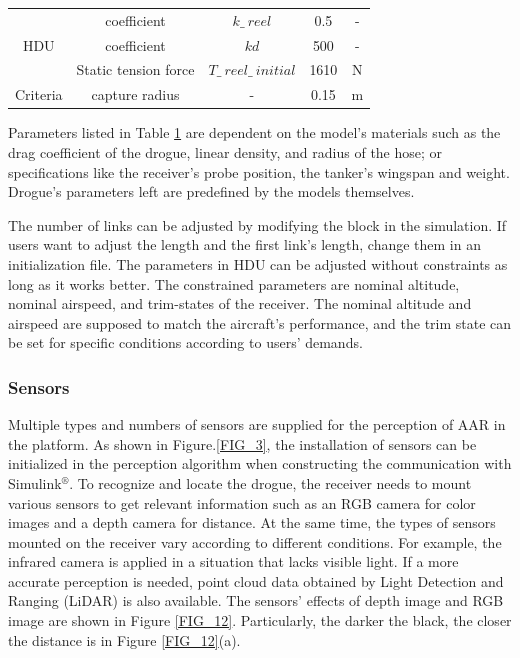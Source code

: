 \begin{table}[!th]
{{\begin{tabular}[c]{c|c|ccc}
				\multirow{3}{*}{HDU} & coefficient & $ k\_\ reel $ & 0.5 & - \\
				\cline{2-5}
				& coefficient & $ kd $ & 500 & - \\
				\cline{2-5}
				& Static tension    force & $ T\_\ reel\_\ initial $ & 1610 & N \\
				\hline
				Criteria & capture radius & - & 0.15 & m
				\\\hline
				
				
	\end{tabular}}}\label{Tab_2}
\end{table}

Parameters listed in Table \ref{Tab_2} are dependent on the model's materials such as the drag coefficient of the drogue, linear density, and radius of the hose; or specifications like the receiver's probe position, the tanker's wingspan and weight. Drogue's parameters left are predefined by the models themselves. 

The number of links can be adjusted by modifying the block in the simulation. If users want to adjust the length and the first link's length, change them in an initialization file. The parameters in HDU can be adjusted without constraints as long as it works better. The constrained parameters are nominal altitude, nominal airspeed, and trim-states of the receiver. The nominal altitude and airspeed are supposed to match the aircraft's performance, and the trim state can be set for specific conditions according to users' demands. 
\subsubsection{Sensors }\label{sec4.2.2}
Multiple types and numbers of sensors are supplied for the perception of AAR in the platform. As shown in Figure.\ref{FIG_3}, the installation of sensors can be initialized in the perception algorithm when constructing the communication with Simulink$^\circledR$. To recognize and locate the drogue, the receiver needs to mount various sensors to get relevant information such as an RGB camera for color images and a depth camera for distance. At the same time, the types of sensors mounted on the receiver vary according to different conditions. For example, the infrared camera is applied in a situation that lacks visible light. If a more accurate perception is needed, point cloud data obtained by Light Detection and Ranging (LiDAR) is also available. The sensors' effects of depth image and RGB image are shown in Figure \ref{FIG_12}. Particularly, the darker the black, the closer the distance is in Figure \ref{FIG_12}(a).

